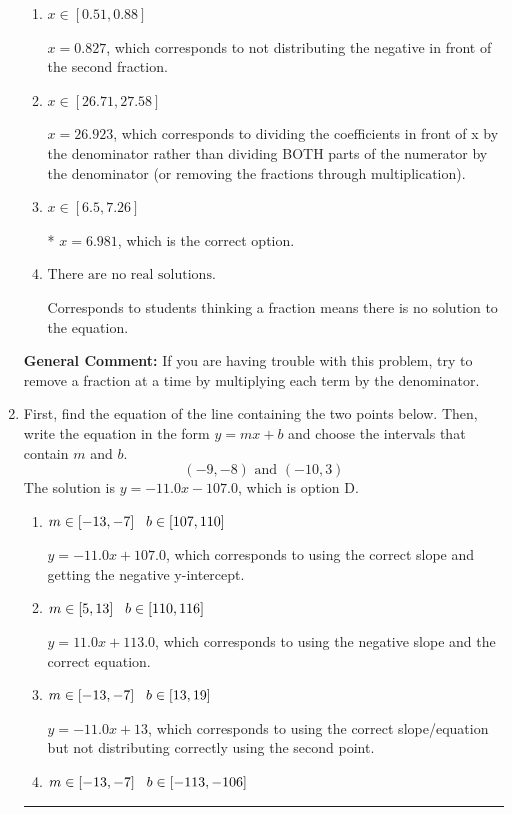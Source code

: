 \documentclass{extbook}[14pt]
\newcommand{\litem}[1]{\item #1

\rule{\textwidth}{0.4pt}}
\begin{document}
\begin{enumerate}
{\begin{enumerate}[label=\Alph*.]
 $x = -0.648$, which corresponds to dividing the second number in the numerator by the denominator rather than dividing BOTH parts of the numerator by the denominator (or removing the fractions through multiplication).
\item \( x \in [0.51, 0.88] \)

 $x = 0.827$, which corresponds to not distributing the negative in front of the second fraction.
\item \( x \in [26.71, 27.58] \)

 $x = 26.923$, which corresponds to dividing the coefficients in front of x by the denominator rather than dividing BOTH parts of the numerator by the denominator (or removing the fractions through multiplication).
\item \( x \in [6.5, 7.26] \)

* $x = 6.981$, which is the correct option.
\item \( \text{There are no real solutions.} \)

Corresponds to students thinking a fraction means there is no solution to the equation.
\end{enumerate}

\textbf{General Comment:} If you are having trouble with this problem, try to remove a fraction at a time by multiplying each term by the denominator.
}
\litem{
First, find the equation of the line containing the two points below. Then, write the equation in the form $ y=mx+b $ and choose the intervals that contain $m$ and $b$.
\[ (-9, -8) \text{ and } (-10, 3) \]The solution is \( y = -11.0x -107.0 \), which is option D.\begin{enumerate}[label=\Alph*.]
\item \( m \in [-13, -7] \hspace*{3mm} b \in [107, 110] \)

 $y = -11.0x + 107.0$, which corresponds to using the correct slope and getting the negative y-intercept.
\item \( m \in [5, 13] \hspace*{3mm} b \in [110, 116] \)

 $y = 11.0x + 113.0$, which corresponds to using the negative slope and the correct equation.
\item \( m \in [-13, -7] \hspace*{3mm} b \in [13, 19] \)

 $y = -11.0x + 13$, which corresponds to using the correct slope/equation but not distributing correctly using the second point.
\item \( m \in [-13, -7] \hspace*{3mm} b \in [-113, -106] \)


\end{enumerate}}
\end{enumerate}
\end{document}
